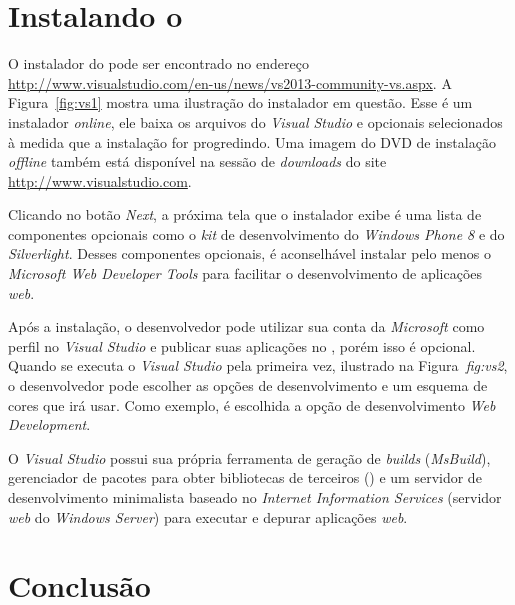 
\section{Instalando o } 

O instalador do  pode ser encontrado no endereço \url{http://www.visualstudio.com/en-us/news/vs2013-community-vs.aspx}. A Figura~\ref{fig:vs1} mostra uma ilustração do instalador em questão. Esse é um instalador \textit{online}, ele baixa os arquivos do \textit{Visual Studio} e opcionais selecionados à medida que a instalação for progredindo. Uma imagem do DVD de instalação \textit{offline} também está disponível na sessão de \textit{downloads} do site \url{http://www.visualstudio.com}.


Clicando no botão \textit{Next}, a próxima tela que o instalador exibe é uma lista de componentes opcionais como o \textit{kit} de desenvolvimento do \textit{Windows Phone 8} e do \textit{Silverlight}. Desses componentes opcionais, é aconselhável instalar pelo menos o \textit{Microsoft Web Developer Tools} para facilitar o desenvolvimento de aplicações \textit{web}.

Após a instalação, o desenvolvedor pode utilizar sua conta da \textit{Microsoft} como perfil no \textit{Visual Studio} e publicar suas aplicações no , porém isso é opcional. Quando se executa o \textit{Visual Studio} pela primeira vez, ilustrado na Figura~\textit{fig:vs2}, o desenvolvedor pode escolher as opções de desenvolvimento e um esquema de cores que irá usar. Como exemplo, é escolhida a opção de desenvolvimento \textit{Web Development}.


O \textit{Visual Studio} possui sua própria ferramenta de geração de \textit{builds} (\textit{MsBuild}), gerenciador de pacotes para obter bibliotecas de terceiros () e um servidor de desenvolvimento minimalista baseado no \textit{Internet Information Services} (servidor \textit{web} do \textit{Windows Server}) para executar e depurar aplicações \textit{web}.  

\section{Conclusão}

